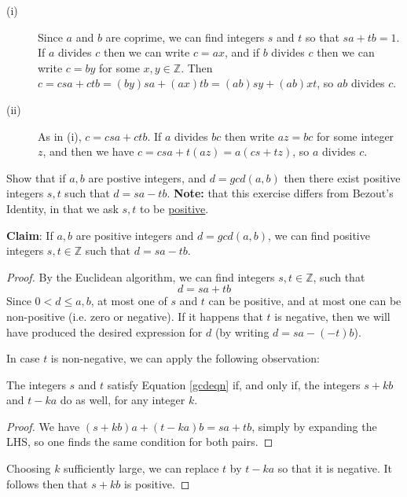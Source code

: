 \documentclass[11pt,dvipsnames]{book}
\def\Z{\mathbb{Z}}
\numberwithin{figure}{section} %
\numberwithin{table}{section} %
\begin{document}
\begin{solution}
\begin{description}
\item[(i)] Since $a$ and $b$ are coprime, we can find integers $s$ and $t$ so that $sa + tb = 1$. If $a$ divides $c$ then we can write $c = ax$, and if $b$ divides $c$ then we can write $c = by$ for some $x,y \in \Z$. Then $c = csa + ctb = (by)sa + (ax)tb = (ab)sy + (ab)xt$, so $ab $ divides $ c$.
\item[(ii)] As in (i), $c = csa + ctb$. If $a $ divides $bc$ then write $az = bc$ for some integer $z$, and then we have $c = csa + t(az) = a(cs + tz)$, so $a$ divides $c$.
\end{description}
\end{solution}

\begin{exercise}
Show that if $a, b$ are postive integers, and $d=gcd(a,b)$ then there exist positive integers $s, t$ such that $d=sa-tb$. {\bf Note:} that this exercise differs from Bezout’s  Identity, in that we ask $s, t$ to be \underline{positive}.

\begin{solution}
{\bf Claim}: If $a,b$ are positive integers and $d=gcd(a,b)$, we can find positive integers $s, t \in\mathbb{Z}$ such that $d=sa-tb$.

\begin{proof}  By the Euclidean algorithm, we can find integers $s,t\in\mathbb{Z}$, such that
\begin{equation}d=sa+tb\label{gcdeqn}\end{equation}
Since $0<d\leq a,b$, at most one of $s$ and $t$ can be positive, and at most one can be non-positive (i.e. zero or negative).  If it happens that $t$ is negative, then we will have produced the desired expression for $d$ (by writing $d=sa - (-t)b$).

In case $t$ is non-negative, we can apply the following observation:
\begin{lemma} The integers $s$ and $t$ satisfy Equation \eqref{gcdeqn} if, and only if, the integers $s+kb$ and $t-ka$ do as well, for any integer $k$.\end{lemma}
\begin{proof} We have $(s+kb)a + (t-ka)b = sa+tb$, simply by expanding the LHS, so one finds the same condition for both pairs.\end{proof}

Choosing $k$ sufficiently large, we can replace $t$ by $t-ka$ so that it is negative.  It follows then that $s+kb$ is positive.
\end{proof}

\end{solution}

\end{exercise}
\end{document}
